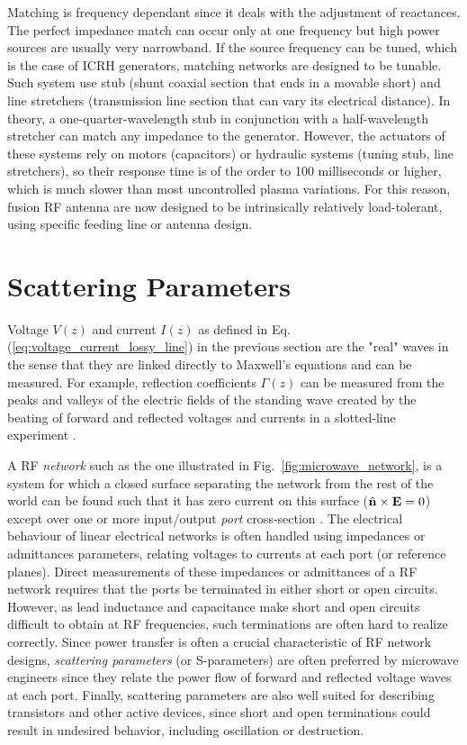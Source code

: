Matching is frequency dependant since it deals with the adjustment of reactances. The perfect impedance match can occur only at one frequency but high power sources are usually very narrowband. If the source frequency can be tuned, which is the case of ICRH generators, matching networks are designed to be tunable. Such system use stub (shunt coaxial section that ends in a movable short) and line stretchers (transmission line section that can vary its electrical distance). In theory, a one-quarter-wavelength stub in conjunction with a half-wavelength stretcher can match any impedance to the generator. However, the actuators of these systems rely on motors (capacitors) or hydraulic systems (tuning stub, line stretchers), so their response time is of the order to 100 milliseconds or higher, which is much slower than most uncontrolled plasma variations. For this reason, fusion RF antenna are now designed to be intrinsically relatively load-tolerant, using specific feeding line or antenna design. 


\section{Scattering Parameters}\label{sec:s-parameters}
Voltage  $V(z)$ and current $I(z)$ as defined in Eq.(\ref{eq:voltage_current_lossy_line}) in the previous section are the "real" waves in the sense that they are linked directly to Maxwell’s equations and can be measured. For example, reflection coefficients $\Gamma(z)$ can be measured from the peaks and valleys of the electric fields of the standing wave created by the beating of forward and reflected voltages and currents in a slotted-line experiment . 

A RF \textit{network} such as the one illustrated in Fig.~\ref{fig:microwave_network}, is a system for which a closed surface separating the network from the rest of the world can be found such that it has zero current on this surface ($\hat{\mathbf{n}} \times {\mathbf E}=0$) except over one or more input/output \textit{port} cross-section \cite[§8.3]{Harrington2001}. The electrical behaviour of linear electrical networks is often handled using impedances or admittances parameters, relating voltages to currents at each port (or reference planes). Direct measurements of these impedances or admittances of a RF network requires that the ports be terminated in either short or open circuits. However, as lead inductance and capacitance make short and open circuits difficult to obtain at RF frequencies, such terminations are often hard to realize correctly. Since power transfer is often a crucial characteristic of RF network designs, \textit{scattering parameters} (or S-parameters) are often preferred by microwave engineers since they relate the power flow of forward and reflected voltage waves at each port. Finally, scattering parameters are also well suited for describing transistors and other active devices, since short and open  terminations could result in undesired behavior, including oscillation or destruction.

